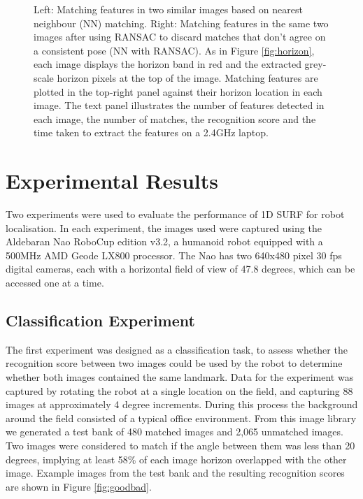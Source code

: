 \documentclass[runningheads,a4paper]{llncs}
\begin{document}
\begin{figure} [h]
\begin{minipage}[b]{0.5\textwidth}
\end{minipage}
\caption{Left: Matching features in two similar images based on nearest neighbour (NN) matching. Right: Matching features in the same two images after using RANSAC to discard matches that don't agree on a consistent pose (NN with RANSAC). As in Figure \ref{fig:horizon}, each image displays the horizon band in red and the extracted grey-scale horizon pixels at the top of the image. Matching features are plotted in the top-right panel against their horizon location in each image. The text panel illustrates the number of features detected in each image, the number of matches, the recognition score and the time taken to extract the features on a 2.4GHz laptop.}\label{fig:NN}
\end{figure}


\section{Experimental Results} 
\label{sec:results}

Two experiments were used to evaluate the performance of 1D SURF for robot localisation. In each experiment, the images used were captured using the Aldebaran Nao RoboCup edition v3.2, a humanoid robot equipped with a 500MHz AMD Geode LX800 processor. The Nao has two 640x480 pixel 30 fps digital cameras, each with a horizontal field of view of 47.8 degrees, which can be accessed one at a time. 

\subsection{Classification Experiment}
The first experiment was designed as a classification task, to assess whether the recognition score between two images could be used by the robot to determine whether both images contained the same landmark. Data for the experiment was captured by rotating the robot at a single location on the field, and capturing 88 images at approximately 4 degree increments. During this process the background around the field consisted of a typical office environment. From this image library we generated a test bank of 480 matched images and 2,065 unmatched images. Two images were considered to match if the angle between them was less than 20 degrees, implying at least 58\% of each image horizon overlapped with the other image. Example images from the test bank and the resulting recognition scores are shown in Figure \ref{fig:goodbad}.
\end{document}
